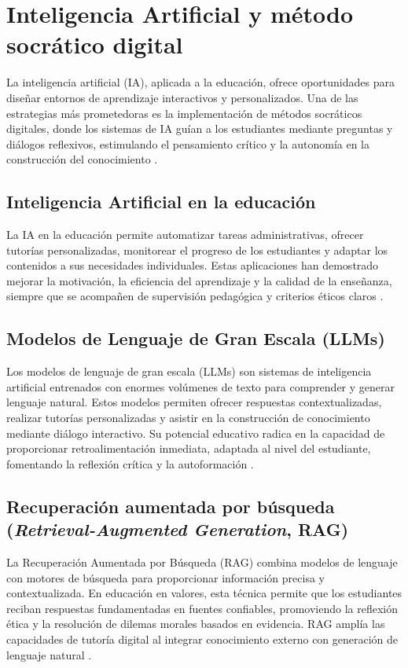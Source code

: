 \section{Inteligencia Artificial y método socrático digital}
La inteligencia artificial (IA), aplicada a la educación, ofrece oportunidades
para diseñar entornos de aprendizaje interactivos y personalizados. Una de las
estrategias más prometedoras es la implementación de métodos socráticos
digitales, donde los sistemas de IA guían a los estudiantes mediante preguntas
y diálogos reflexivos, estimulando el pensamiento crítico y la autonomía en la
construcción del conocimiento \cite{holmes2019ai, woolf2010building}.

\subsection{Inteligencia Artificial en la educación}
La IA en la educación permite automatizar tareas administrativas, ofrecer
tutorías personalizadas, monitorear el progreso de los estudiantes y adaptar
los contenidos a sus necesidades individuales. Estas aplicaciones han
demostrado mejorar la motivación, la eficiencia del aprendizaje y la calidad de
la enseñanza, siempre que se acompañen de supervisión pedagógica y criterios
éticos claros \cite{elstad2024ai, frontiers2025education, carter2024ethics}.

\subsection{Modelos de Lenguaje de Gran Escala (LLMs)}
Los modelos de lenguaje de gran escala (LLMs) son sistemas de inteligencia
artificial entrenados con enormes volúmenes de texto para comprender y generar
lenguaje natural. Estos modelos permiten ofrecer respuestas contextualizadas,
realizar tutorías personalizadas y asistir en la construcción de conocimiento
mediante diálogo interactivo. Su potencial educativo radica en la capacidad de
proporcionar retroalimentación inmediata, adaptada al nivel del estudiante,
fomentando la reflexión crítica y la autoformación \cite{brown2020language,
    raffel2020exploring}.

\subsection{Recuperación aumentada por búsqueda (\textit{Retrieval-Augmented Generation}, RAG)}
La Recuperación Aumentada por Búsqueda (RAG) combina modelos de lenguaje con
motores de búsqueda para proporcionar información precisa y contextualizada. En
educación en valores, esta técnica permite que los estudiantes reciban
respuestas fundamentadas en fuentes confiables, promoviendo la reflexión ética
y la resolución de dilemas morales basados en evidencia. RAG amplía las
capacidades de tutoría digital al integrar conocimiento externo con generación
de lenguaje natural \cite{lewis2020retrieval, khandelwal2020generalization}.

